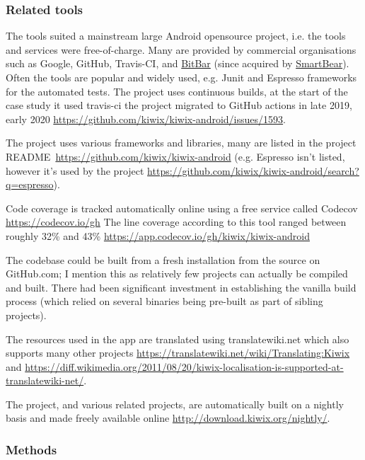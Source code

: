 \subsubsection{Related tools}
The tools suited a mainstream large Android opensource project, i.e. the tools and services were free-of-charge. Many are provided by commercial organisations such as Google, GitHub, Travis-CI, and \href{https://bitbar.com/}{BitBar} (since acquired by \href{https://smartbear.com/}{SmartBear}). Often the tools are popular and widely used, e.g. Junit and Espresso frameworks for the automated tests. The project uses continuous builds, at the start of the case study it used travis-ci the project migrated to GitHub actions in late 2019, early 2020 \url{https://github.com/kiwix/kiwix-android/issues/1593}.

The project uses various frameworks and libraries, many are listed in the project README~\url{https://github.com/kiwix/kiwix-android} (e.g. Espresso isn’t listed, however it’s used by the project \url{https://github.com/kiwix/kiwix-android/search?q=espresso}).

Code coverage is tracked automatically online using a free service called Codecov \url{https://codecov.io/gh} The line coverage according to this tool ranged between roughly 32\% and 43\% \url{https://app.codecov.io/gh/kiwix/kiwix-android}  

The codebase could be built from a fresh installation from the source on GitHub.com; I mention this as relatively few projects can actually be compiled and built. There had been significant investment in establishing the vanilla build process (which relied on several binaries being pre-built as part of sibling projects).

The resources used in the app are translated using translatewiki.net which also supports many other projects \url{https://translatewiki.net/wiki/Translating:Kiwix} and \url{https://diff.wikimedia.org/2011/08/20/kiwix-localisation-is-supported-at-translatewiki-net/}.

The project, and various related projects, are automatically built on a nightly basis and made freely available online \url{http://download.kiwix.org/nightly/}.

\subsubsection{Methods}

